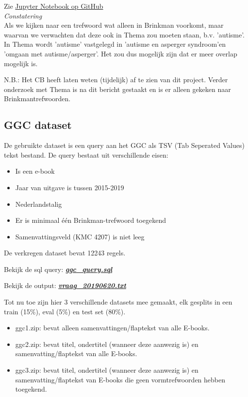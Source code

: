\documentclass{article}
\begin{document}

Zie \href{https://github.com/KBNLresearch/Annif_data_exp/blob/master/compare_Brinkman_and_Thema.ipynb}{Jupyter Notebook op GitHub}\\[2pt]

\noindent
\textit{Constatering} \\
Als we kijken naar een trefwoord wat alleen in Brinkman voorkomt, maar waarvan we verwachten dat deze ook in Thema zou moeten staan, b.v. 'autisme'. In Thema wordt 'autisme' vastgelegd in 'autisme en asperger syndroom'en 'omgaan met autisme/asperger'. Het zou dus mogelijk zijn dat er meer overlap mogelijk is.

N.B.: Het CB heeft laten weten (tijdelijk) af te zien van dit project. Verder onderzoek met Thema is na dit bericht gestaakt en is er alleen gekeken naar Brinkmantrefwoorden.


\subsection{GGC dataset}

De gebruikte dataset is een query aan het GGC als TSV (Tab Seperated Values) tekst bestand. De query bestaat uit verschillende eisen:

\begin{itemize}
    \item Is een e-book
    \item Jaar van uitgave is tussen 2015-2019
    \item Nederlandstalig
    \item Er is minimaal één Brinkman-trefwoord toegekend
    \item Samenvattingsveld (KMC 4207) is niet leeg
\end{itemize}

De verkregen dataset bevat 12243 regels.

\begin{shaded}
Bekijk de sql query: \quad
\href{run:resources/ggc_query.sql}{\textbf{\textit{ggc\_query.sql}}}

Bekijk de output: \quad \quad
\href{run:resources/vraag_20190620.txt}{\textbf{\textit{vraag\_20190620.txt}}}
\end{shaded}

Tot nu toe zijn hier 3 verschillende datasets mee gemaakt, elk gesplits in een train (15\%), eval (5\%) en test set (80\%). 
\begin{itemize}
  \item ggc1.zip: bevat alleen samenvattingen/flaptekst van alle E-books.
  \item ggc2.zip: bevat titel, ondertitel (wanneer deze aanwezig is) en samenvatting/flaptekst van alle E-books.
  \item ggc3.zip: bevat titel, ondertitel (wanneer deze aanwezig is) en samenvatting/flaptekst van E-books die geen vormtrefwoorden hebben toegekend.
\end{itemize}
\end{document}
